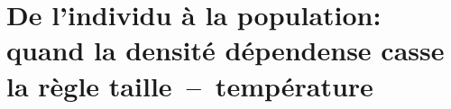 \chapter[FIP]{De l'individu à la population: quand la densité dépendense casse la règle taille~--~température}
\label{chap:fip}

